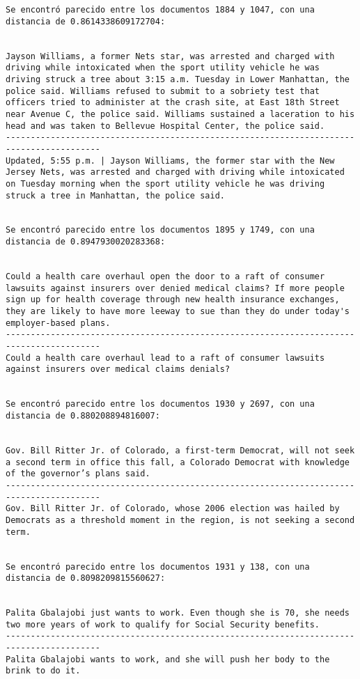\documentclass[11pt]{article}
\begin{document}
\begin{Verbatim}[commandchars=\\\{\}]
Se encontró parecido entre los documentos 1884 y 1047, con una distancia de 0.8614338609172704:


Jayson Williams, a former Nets star, was arrested and charged with driving while intoxicated when the sport utility vehicle he was driving struck a tree about 3:15 a.m. Tuesday in Lower Manhattan, the police said. Williams refused to submit to a sobriety test that officers tried to administer at the crash site, at East 18th Street near Avenue C, the police said. Williams sustained a laceration to his head and was taken to Bellevue Hospital Center, the police said.
-----------------------------------------------------------------------------------------
Updated, 5:55 p.m. | Jayson Williams, the former star with the New Jersey Nets, was arrested and charged with driving while intoxicated on Tuesday morning when the sport utility vehicle he was driving struck a tree in Manhattan, the police said.


Se encontró parecido entre los documentos 1895 y 1749, con una distancia de 0.8947930020283368:


Could a health care overhaul open the door to a raft of consumer lawsuits against insurers over denied medical claims? If more people sign up for health coverage through new health insurance exchanges, they are likely to have more leeway to sue than they do under today's employer-based plans.
-----------------------------------------------------------------------------------------
Could a health care overhaul lead to a raft of consumer lawsuits against insurers over medical claims denials?


Se encontró parecido entre los documentos 1930 y 2697, con una distancia de 0.880208894816007:


Gov. Bill Ritter Jr. of Colorado, a first-term Democrat, will not seek a second term in office this fall, a Colorado Democrat with knowledge of the governor’s plans said.
-----------------------------------------------------------------------------------------
Gov. Bill Ritter Jr. of Colorado, whose 2006 election was hailed by Democrats as a threshold moment in the region, is not seeking a second term.


Se encontró parecido entre los documentos 1931 y 138, con una distancia de 0.8098209815560627:


Palita Gbalajobi just wants to work. Even though she is 70, she needs two more years of work to qualify for Social Security benefits.
-----------------------------------------------------------------------------------------
Palita Gbalajobi wants to work, and she will push her body to the brink to do it.



\end{Verbatim}
\end{document}

